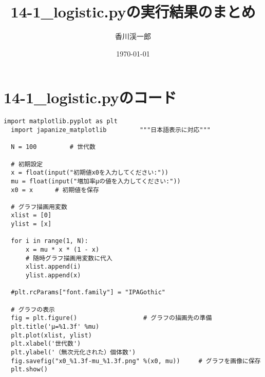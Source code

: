\documentclass[a4paper, oneside]{jsarticle}
\begin{document}
\title{14-1\_logistic.pyの実行結果のまとめ}
\author{香川渓一郎}
\date{\today}

\maketitle

\setcounter{tocdepth}{1}
\tableofcontents

\section{14-1\_logistic.pyのコード}

\begin{lstlisting}[caption=14-1\_logistic.py, label=logistic]
  import matplotlib.pyplot as plt
  import japanize_matplotlib         """日本語表示に対応"""
  
  N = 100         # 世代数
  
  # 初期設定
  x = float(input("初期値x0を入力してください:"))
  mu = float(input("増加率μの値を入力してください:"))
  x0 = x      # 初期値を保存
  
  # グラフ描画用変数
  xlist = [0]
  ylist = [x]
  
  for i in range(1, N):
      x = mu * x * (1 - x)
      # 随時グラフ描画用変数に代入
      xlist.append(i)
      ylist.append(x)
  
  #plt.rcParams["font.family"] = "IPAGothic"
  
  # グラフの表示
  fig = plt.figure()                  # グラフの描画先の準備
  plt.title('μ=%1.3f' %mu)
  plt.plot(xlist, ylist)
  plt.xlabel('世代数')
  plt.ylabel('（無次元化された）個体数')
  fig.savefig("x0_%1.3f-mu_%1.3f.png" %(x0, mu))     # グラフを画像に保存
  plt.show()
\end{lstlisting}
\end{document}
